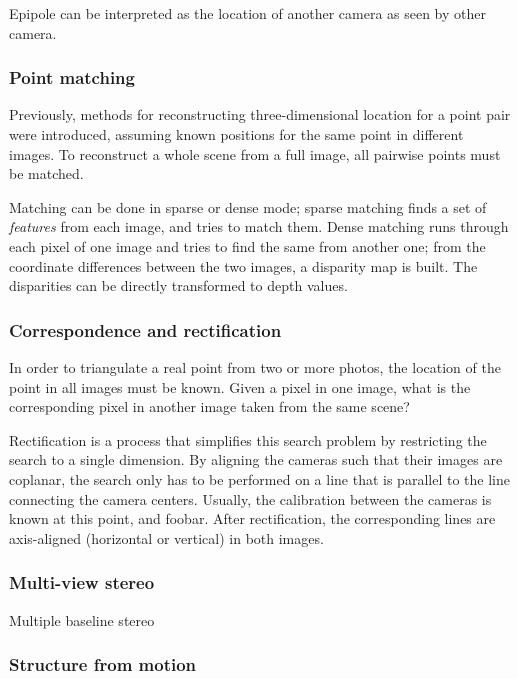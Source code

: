 Epipole can be interpreted as the location of another camera as seen by other camera.

\subsubsection{Point matching}

Previously, methods for reconstructing three-dimensional location for a point pair were introduced, assuming known positions for the same point in different images.
To reconstruct a whole scene from a full image, all pairwise points must be matched.

Matching can be done in sparse or dense mode; sparse matching finds a set of \textit{features} from each image, and tries to match them. Dense matching runs through each pixel of one image and tries to find the same from another one; from the coordinate differences between the two images, a disparity map is built. The disparities can be directly transformed to depth values.


\subsubsection{Correspondence and rectification}

In order to triangulate a real point from two or more photos, the location of the point in all images must be known.
Given a pixel in one image, what is the corresponding pixel in another image taken from the same scene?

Rectification is a process that simplifies this search problem by restricting the search to a single dimension.
By aligning the cameras such that their images are coplanar, the search only has to be performed on a line that is parallel to the line connecting the camera centers.
Usually, the calibration between the cameras is known at this point, and foobar.
After rectification, the corresponding lines are axis-aligned (horizontal or vertical) in both images.


\subsubsection{Multi-view stereo}

Multiple baseline stereo \cite{okotomi1999multiple}

\subsubsection{Structure from motion}

